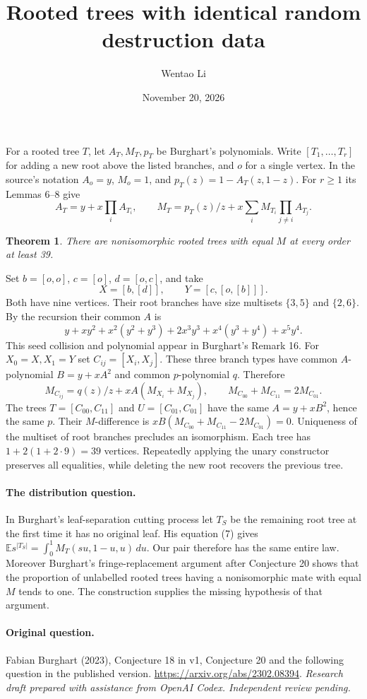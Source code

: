 \documentclass[11pt]{article}
\title{Rooted trees with identical random destruction data}
\author{Wentao Li}
\date{November 20, 2026}
\newtheorem{theorem}{Theorem}
\begin{document}
\maketitle
For a rooted tree $T$, let $A_T,M_T,p_T$ be Burghart's polynomials. Write $[T_1,\ldots,T_r]$ for adding a new root above the listed branches, and $o$ for a single vertex. In the source's notation $A_o=y$, $M_o=1$, and $p_T(z)=1-A_T(z,1-z)$. For $r\ge1$ its Lemmas 6--8 give
\[
 A_T=y+x\prod_i A_{T_i},\qquad M_T=p_T(z)/z+x\sum_i M_{T_i}\prod_{j\ne i}A_{T_j}.
\]
\begin{theorem}There are nonisomorphic rooted trees with equal $M$ at every order at least 39.\end{theorem}
Set $b=[o,o]$, $c=[o]$, $d=[o,c]$, and take
\[
 X=[b,[d]],\qquad Y=[c,[o,[b]]].
\]
Both have nine vertices. Their root branches have size multisets $\{3,5\}$ and $\{2,6\}$. By the recursion their common $A$ is
\[
 y+xy^2+x^2(y^2+y^3)+2x^3y^3+x^4(y^3+y^4)+x^5y^4.
\]
This seed collision and polynomial appear in Burghart's Remark 16. For $X_0=X,X_1=Y$ set $C_{ij}=[X_i,X_j]$. These three branch types have common $A$-polynomial $B=y+xA^2$ and common $p$-polynomial $q$. Therefore
\[
 M_{C_{ij}}=q(z)/z+xA(M_{X_i}+M_{X_j}),\qquad
 M_{C_{00}}+M_{C_{11}}=2M_{C_{01}}.
\]
The trees $T=[C_{00},C_{11}]$ and $U=[C_{01},C_{01}]$ have the same $A=y+xB^2$, hence the same $p$. Their $M$-difference is $xB(M_{C_{00}}+M_{C_{11}}-2M_{C_{01}})=0$. Uniqueness of the multiset of root branches precludes an isomorphism. Each tree has $1+2(1+2\cdot9)=39$ vertices. Repeatedly applying the unary constructor preserves all equalities, while deleting the new root recovers the previous tree.
\paragraph{The distribution question.} In Burghart's leaf-separation cutting process let $T_S$ be the remaining root tree at the first time it has no original leaf. His equation (7) gives $\mathbb E s^{|T_S|}=\int_0^1 M_T(su,1-u,u)\,du$. Our pair therefore has the same entire law. Moreover Burghart's fringe-replacement argument after Conjecture 20 shows that the proportion of unlabelled rooted trees having a nonisomorphic mate with equal $M$ tends to one. The construction supplies the missing hypothesis of that argument.

\paragraph{Original question.} Fabian Burghart (2023), Conjecture 18 in v1, Conjecture 20 and the following question in the published version. \url{https://arxiv.org/abs/2302.08394}.
\medskip\noindent\textit{Research draft prepared with assistance from OpenAI Codex. Independent review pending.}
\end{document}
